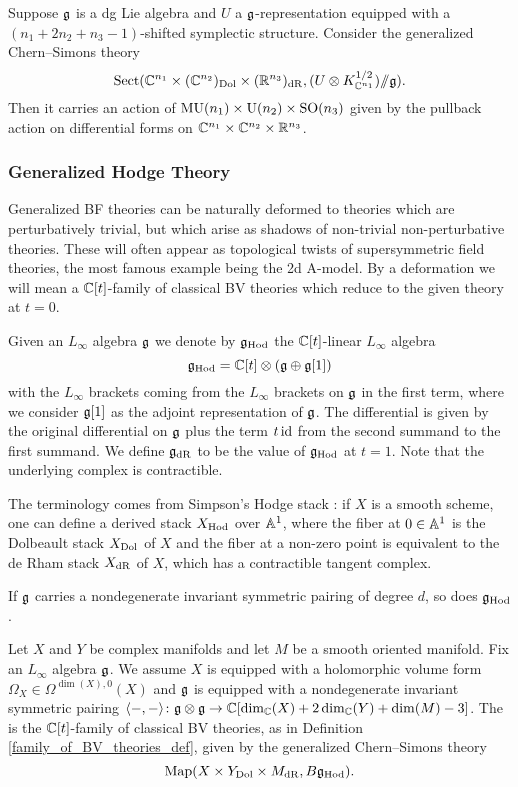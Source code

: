 \documentclass[10pt, oneside]{article}
\begin{document}
\begin{prop}
Suppose $\mathfrak g$ is a dg Lie algebra and $U$ a $\mathfrak g$-representation equipped with a $(n_1+2n_2+n_3-1)$-shifted symplectic structure. Consider the generalized Chern--Simons theory
\[\mathrm{Sect}(\mathbb C^{n_1}\times (\mathbb C^{n_2})_{\mathrm{Dol}}\times (\mathbb R^{n_3})_{\mathrm{dR}}, (U\otimes K_{\mathbb C^{n_1}}^{1/2})/\!\!/\mathfrak g).\]
Then it carries an action of $\mathrm{MU}(n_1)\times \mathrm{U}(n_2)\times \mathrm{SO}(n_3)$ given by the pullback action on differential forms on $\mathbb C^{n_1}\times \mathbb C^{n_2}\times \mathbb R^{n_3}$.
\end{prop}

\subsubsection{Generalized Hodge Theory}
Generalized BF theories can be naturally deformed to theories which are perturbatively trivial, but which arise as shadows of non-trivial non-perturbative theories.  These will often appear as topological twists of supersymmetric field theories, the most famous example being the 2d A-model. By a deformation we will mean a $\mathbb C[t]$-family of classical BV theories which reduce to the given theory at $t=0$.

Given an $L_\infty$ algebra $\mathfrak g$ we denote by $\mathfrak g_{\mathrm{Hod}}$ the $\mathbb C[t]$-linear $L_\infty$ algebra
\[\mathfrak g_{\mathrm{Hod}} = \mathbb C[t]\otimes (\mathfrak g\oplus \mathfrak g[1])\]
with the $L_\infty$ brackets coming from the $L_\infty$ brackets on $\mathfrak g$ in the first term, where we consider $\mathfrak g[1]$ as the adjoint representation of $\mathfrak g$. The differential is given by the original differential on $\mathfrak g$ plus the term $t\operatorname{id}$ from the second summand to the first summand. We define $\mathfrak g_{\mathrm{dR}}$ to be the value of $\mathfrak g_{\mathrm{Hod}}$ at $t=1$. Note that the underlying complex is contractible.

\begin{remark}
The terminology comes from Simpson's Hodge stack \cite{Simpson}: if $X$ is a smooth scheme, one can define a derived stack $X_{\mathrm{Hod}}$ over $\mathbb{A}^1$, where the fiber at $0 \in \mathbb{A}^1$ is the Dolbeault stack $X_{\mathrm{Dol}}$ of $X$ and the fiber at a non-zero point is equivalent to the de Rham stack $X_{\mathrm{dR}}$ of $X$, which has a contractible tangent complex.
\end{remark}

If $\mathfrak g$ carries a nondegenerate invariant symmetric pairing of degree $d$, so does $\mathfrak g_{\mathrm{Hod}}$.

\begin{definition} \label{Hodge_family_def}
Let $X$ and $Y$ be complex manifolds and let $M$ be a smooth oriented manifold. Fix an $L_\infty$ algebra $\mathfrak g$. We assume $X$ is equipped with a holomorphic volume form $\Omega_X \in\Omega^{\dim(X), 0}(X)$ and $\mathfrak g$ is equipped with a nondegenerate invariant symmetric pairing $\langle-, -\rangle\colon \mathfrak g\otimes\mathfrak g\rightarrow \mathbb C[\dim_\mathbb C(X) + 2\dim_\mathbb C(Y) + \dim(M) - 3]$. The  is the $\mathbb C[t]$-family of classical BV theories, as in Definition \ref{family_of_BV_theories_def}, given by the generalized Chern--Simons theory
\[\operatorname{Map}(X\times Y_{\mathrm{Dol}}\times M_{\mathrm{dR}}, B \mathfrak g_{\mathrm{Hod}}).\]
\end{definition}
\end{document}
